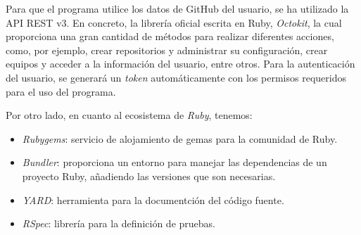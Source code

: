 Para que el programa utilice los datos de GitHub del usuario, se ha utilizado la API REST v3. En concreto,
la librería oficial escrita en Ruby, {\it Octokit}, la cual proporciona una gran cantidad de métodos para realizar diferentes acciones, como, por ejemplo,
crear repositorios y administrar su configuración, crear equipos y acceder a la información del usuario, entre otros.
Para la autenticación del usuario, se generará un {\it token} automáticamente con los permisos requeridos para el uso del programa.

Por otro lado, en cuanto al ecosistema de {\it Ruby}, tenemos:
\begin{itemize}
  \item {\it Rubygems}: servicio de alojamiento de gemas para la comunidad de Ruby.
  \item {\it Bundler}: proporciona un entorno para manejar las dependencias de un proyecto Ruby, añadiendo las versiones que son necesarias.
  \item {\it YARD}: herramienta para la documentción del código fuente.
  \item {\it RSpec}: librería para la definición de pruebas.
\end{itemize}
